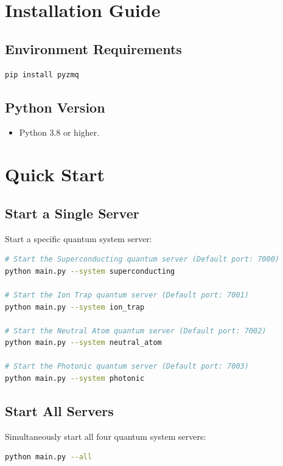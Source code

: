 \documentclass[UTF8, a4paper, 12pt]{article}
\begin{document}
\section{Installation Guide}

\subsection{Environment Requirements}
\begin{lstlisting}[language=bash]
pip install pyzmq
\end{lstlisting}

\subsection{Python Version}
\begin{itemize}
    \item Python 3.8 or higher.
\end{itemize}

\section{Quick Start}

\subsection{Start a Single Server}
Start a specific quantum system server:

\begin{lstlisting}[language=bash]
# Start the Superconducting quantum server (Default port: 7000)
python main.py --system superconducting

# Start the Ion Trap quantum server (Default port: 7001)
python main.py --system ion_trap

# Start the Neutral Atom quantum server (Default port: 7002)
python main.py --system neutral_atom

# Start the Photonic quantum server (Default port: 7003)
python main.py --system photonic
\end{lstlisting}

\subsection{Start All Servers}
Simultaneously start all four quantum system servers:
\begin{lstlisting}[language=bash]
python main.py --all
\end{lstlisting}
\end{document}
